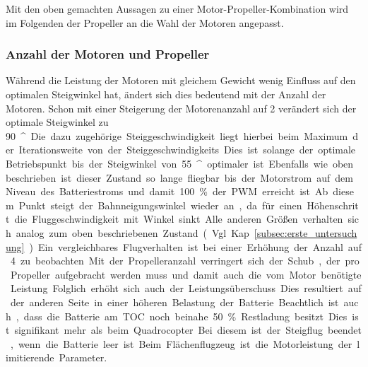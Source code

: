 Mit den oben gemachten Aussagen zu einer Motor-Propeller-Kombination wird im Folgenden der Propeller an die Wahl der Motoren angepasst.


\subsubsection{Anzahl der Motoren und Propeller}
\label{subsubsec:anz_mot_flaechenflzg}
Während die Leistung der Motoren mit gleichem Gewicht wenig Einfluss auf den optimalen Steigwinkel hat, ändert sich dies bedeutend mit der Anzahl der Motoren. Schon mit einer Steigerung der Motorenanzahl auf 2 verändert sich der optimale Steigwinkel zu \SI{90}{^\circ}. Die dazu zugehörige Steiggeschwindigkeit liegt hierbei beim Maximum der Iterationsweite von der Steiggeschwindigkeits. Dies ist solange der optimale Betriebspunkt bis der Steigwinkel von \SI{55}{^\circ} optimaler ist.
Ebenfalls wie oben beschrieben ist dieser Zustand so lange fliegbar bis der Motorstrom auf dem Niveau des Batteriestroms und damit \SI{100}{\%} der PWM erreicht ist. Ab diesem Punkt steigt der Bahnneigungswinkel wieder an, da für einen Höhenschritt die Fluggeschwindigkeit mit Winkel sinkt. Alle anderen Größen verhalten sich analog zum oben beschriebenen Zustand (Vgl. Kap. \ref{subsec:erste_untersuchung}). Ein vergleichbares Flugverhalten ist bei einer Erhöhung der Anzahl auf 4 zu beobachten.
Mit der Propelleranzahl verringert sich der Schub, der pro Propeller aufgebracht werden muss und damit auch die vom Motor benötigte Leistung. Folglich erhöht sich auch der Leistungsüberschuss. Dies resultiert auf der anderen Seite in einer höheren Belastung der Batterie. Beachtlich ist auch, dass die Batterie am TOC noch beinahe \SI{50}{\%} Restladung besitzt. Dies ist signifikant mehr als beim Quadrocopter. Bei diesem ist der Steigflug beendet, wenn die Batterie leer ist. Beim Flächenflugzeug ist die Motorleistung der limitierende Parameter.

